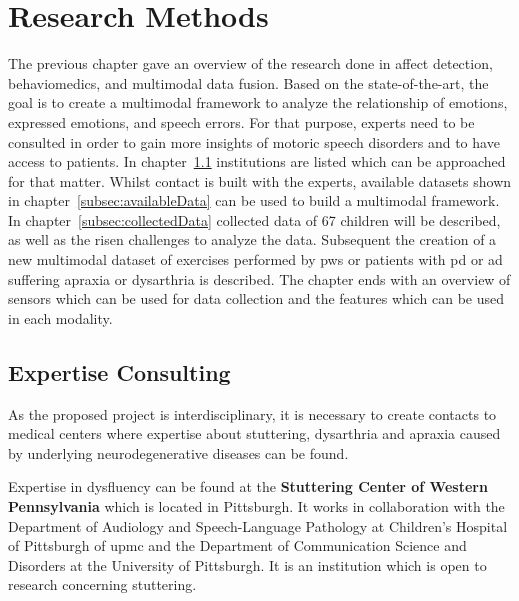 \chapter{Research Methods}
\label{cha:methods}
\acresetall

The previous chapter gave an overview of the research done in affect detection, \gls{behaviomedics}, and multimodal data fusion. Based on the state-of-the-art, the goal is to create a multimodal framework to analyze the relationship of emotions, expressed emotions, and speech errors. For that purpose, experts need to be consulted in order to gain more insights of motoric speech disorders and to have access to patients. In chapter~\ref{sec:experts} institutions are listed which can be approached for that matter. Whilst contact is built with the experts, available datasets shown in chapter~\ref{subsec:availableData} can be used to build a multimodal framework. In chapter~\ref{subsec:collectedData} collected data of 67 children will be described, as well as the risen challenges to analyze the data.
Subsequent the creation of a new multimodal dataset of exercises performed by \gls{pws} or patients with \gls{pd} or \gls{ad} suffering \gls{apraxia} or \gls{dysarthria} is described. 
The chapter ends with an overview of sensors which can be used for data collection and the features which can be used in each modality. 

\section{Expertise Consulting}
\label{sec:experts}
As the proposed project is interdisciplinary, it is necessary to create contacts to medical centers where expertise about \gls{stuttering}, \gls{dysarthria} and \gls{apraxia} caused by underlying neurodegenerative diseases can be found.

Expertise in dysfluency can be found at the \textbf{Stuttering Center of Western Pennsylvania} which is located in Pittsburgh. It works in collaboration with the Department of Audiology and Speech-Language Pathology at Children's Hospital of Pittsburgh of \gls{upmc} and the Department of Communication Science and Disorders at the University of Pittsburgh. It is an institution which is open to research concerning stuttering. 

